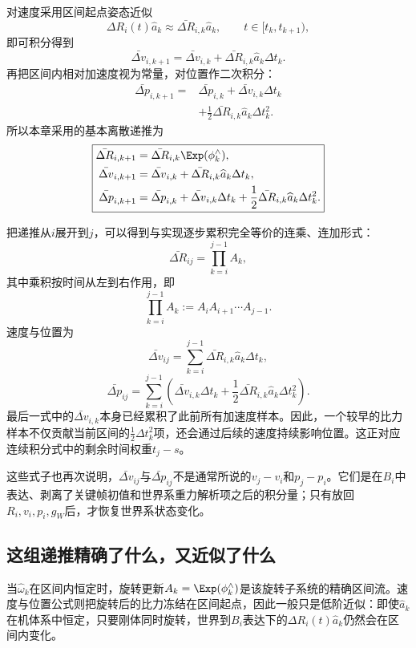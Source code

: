 对速度采用区间起点姿态近似
\[
    \Delta R_i(t)\widehat a_k
    \approx
    \bar{\Delta R}_{i,k}\widehat a_k,
    \qquad t\in[t_k,t_{k+1}),
\]
即可积分得到
\[
\boxed{
    \bar{\Delta v}_{i,k+1}
    =\bar{\Delta v}_{i,k}
    +\bar{\Delta R}_{i,k}\widehat a_k\Delta t_k.
}
\]
再把区间内相对加速度视为常量，对位置作二次积分：
\[
\boxed{
\begin{aligned}
    \bar{\Delta p}_{i,k+1}
    ={}&\bar{\Delta p}_{i,k}
    +\bar{\Delta v}_{i,k}\Delta t_k\\
    &+\frac12\bar{\Delta R}_{i,k}
      \widehat a_k\Delta t_k^2.
\end{aligned}
}
\]
所以本章采用的基本离散递推为
\[
\boxed{
\begin{aligned}
    \bar{\Delta R}_{i,k+1}
    &=\bar{\Delta R}_{i,k}\Exp(\phi_k^\wedge),\\
    \bar{\Delta v}_{i,k+1}
    &=\bar{\Delta v}_{i,k}
      +\bar{\Delta R}_{i,k}\widehat a_k\Delta t_k,\\
    \bar{\Delta p}_{i,k+1}
    &=\bar{\Delta p}_{i,k}
      +\bar{\Delta v}_{i,k}\Delta t_k
      +\frac12\bar{\Delta R}_{i,k}
       \widehat a_k\Delta t_k^2.
\end{aligned}
}
\]

把递推从$i$展开到$j$，可以得到与实现逐步累积完全等价的连乘、连加形式：
\[
\boxed{
    \bar{\Delta R}_{ij}
    =\prod_{k=i}^{j-1}A_k,
}
\]
其中乘积按时间从左到右作用，即
\[
    \prod_{k=i}^{j-1}A_k
    :=A_iA_{i+1}\cdots A_{j-1}.
\]
速度与位置为
\[
\boxed{
    \bar{\Delta v}_{ij}
    =\sum_{k=i}^{j-1}
      \bar{\Delta R}_{i,k}\widehat a_k\Delta t_k,
}
\]
\[
\boxed{
    \bar{\Delta p}_{ij}
    =\sum_{k=i}^{j-1}
      \left(
        \bar{\Delta v}_{i,k}\Delta t_k
        +\frac12\bar{\Delta R}_{i,k}
         \widehat a_k\Delta t_k^2
      \right).
}
\]
最后一式中的$\bar{\Delta v}_{i,k}$本身已经累积了此前所有加速度样本。因此，一个较早的比力样本不仅贡献当前区间的$\tfrac12\Delta t_k^2$项，还会通过后续的速度持续影响位置。这正对应连续积分式中的剩余时间权重$t_j-s$。

这些式子也再次说明，$\bar{\Delta v}_{ij}$与$\bar{\Delta p}_{ij}$不是通常所说的$v_j-v_i$和$p_j-p_i$。它们是在$B_i$中表达、剥离了关键帧初值和世界系重力解析项之后的积分量；只有放回$R_i,v_i,p_i,g_W$后，才恢复世界系状态变化。

\subsection{这组递推精确了什么，又近似了什么}

当$\widehat\omega_k$在区间内恒定时，旋转更新$A_k=\Exp(\phi_k^\wedge)$是该旋转子系统的精确区间流。速度与位置公式则把旋转后的比力冻结在区间起点，因此一般只是低阶近似：即使$\widehat a_k$在机体系中恒定，只要刚体同时旋转，世界到$B_i$表达下的$\Delta R_i(t)\widehat a_k$仍然会在区间内变化。

